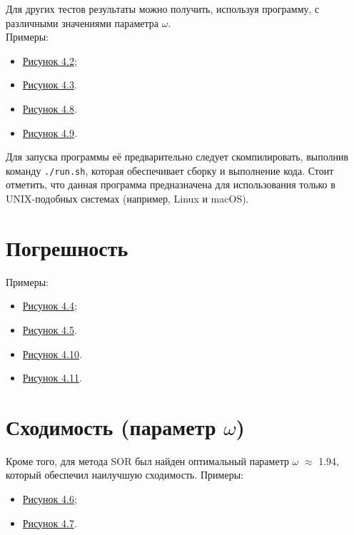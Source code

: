 \documentclass[a4paper, fleqn]{report}
\begin{document}
Для других тестов результаты можно получить, используя программу, с различными значениями параметра \(\omega\). \\
Примеры:
\begin{itemize}
    \item \hyperref[fig:jacobi_1_1]{Рисунок 4.2};
    \item \hyperref[fig:jacobi_1_1000000]{Рисунок 4.3}.
    \item \hyperref[fig:best_res_1_1]{Рисунок 4.8}.
    \item \hyperref[fig:best_res_1_1000000]{Рисунок 4.9}.
\end{itemize}
\vspace{0.25cm}

Для запуска программы её предварительно следует скомпилировать, выполнив команду \texttt{./run.sh}, которая обеспечивает сборку и выполнение кода.
Стоит отметить, что данная программа предназначена для использования только в UNIX-подобных системах (например, Linux и macOS).
\newpage

\section*{Погрешность}
Примеры:
\begin{itemize}
    \item \hyperref[fig:dif_jacobi_1_1]{Рисунок 4.4};
    \item \hyperref[fig:dif_jacobi_1_1000000]{Рисунок 4.5}.
    \item \hyperref[fig:best_dif_1_1]{Рисунок 4.10}.
    \item \hyperref[fig:best_dif_1_1000000]{Рисунок 4.11}.
\end{itemize}

\section*{Сходимость (параметр \(\omega\))}
Кроме того, для метода SOR был найден оптимальный параметр \(\omega\) \(\approx\) 1.94, который обеспечил наилучшую сходимость.
Примеры:
\begin{itemize}
    \item \hyperref[fig:best_w_1_1]{Рисунок 4.6};
    \item \hyperref[fig:best_w_1_1000000]{Рисунок 4.7}.
\end{itemize}
\vspace{1cm}
\end{document}
